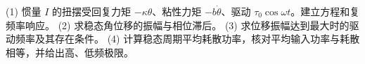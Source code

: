 (1) 惯量 \(I\) 的扭摆受回复力矩 \(-\kappa\theta\)、粘性力矩 \(-b\dot\theta\)、驱动 \(\tau_0\cos\omega t\)。建立方程和复频率响应。
(2) 求稳态角位移的振幅与相位滞后。
(3) 求位移振幅达到最大时的驱动频率及其存在条件。
(4) 计算稳态周期平均耗散功率，核对平均输入功率与耗散相等，并给出高、低频极限。
